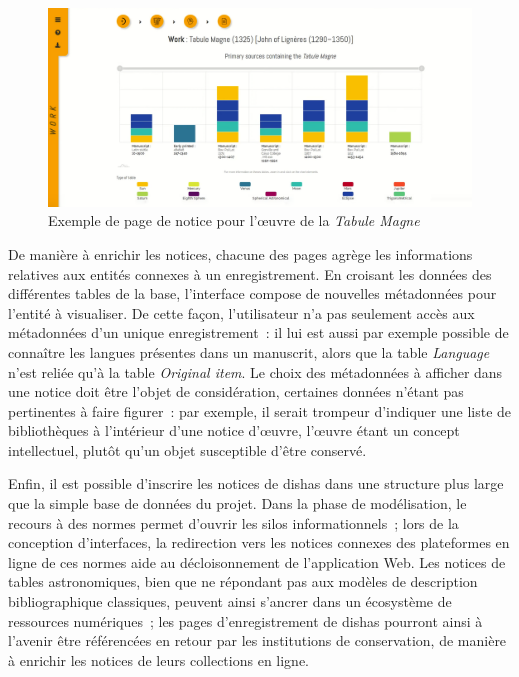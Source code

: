 \documentclass[a4paper,12pt,twoside]{book}
\newcommand{\eng}{\emph}
\newcommand{\Oi}{\eng{Original item}\xspace}
\newcommand{\bdd}{base de données\xspace}
\newcommand{\dishas}{\gls{dishas}\xspace}
\begin{document}
\begin{figure}[h!]
	\centering
	\includegraphics[width=15cm]{Images/Template-record-page.png}
	\caption{Exemple de page de notice pour l'œuvre de la \emph{Tabule Magne}}
\end{figure}

De manière à enrichir les notices, chacune des pages agrège les informations relatives aux entités connexes à un enregistrement. En croisant les données des différentes tables de la base, l'interface compose de nouvelles métadonnées pour l'entité à visualiser. De cette façon, l'utilisateur n'a pas seulement accès aux métadonnées d'un unique enregistrement~: il lui est aussi par exemple possible de connaître les langues présentes dans un manuscrit, alors que la table \eng{Language} n'est reliée qu'à la table \Oi. Le choix des métadonnées à afficher dans une notice doit être l'objet de considération, certaines données n'étant pas pertinentes à faire figurer~: par exemple, il serait trompeur d'indiquer une liste de bibliothèques à l'intérieur d'une notice d'œuvre, l'œuvre étant un concept intellectuel, plutôt qu'un objet susceptible d'être conservé.

Enfin, il est possible d'inscrire les notices de \dishas dans une structure plus large que la simple \bdd du projet. Dans la phase de modélisation, le recours à des normes permet d'ouvrir les silos informationnels~; lors de la conception d'interfaces, la redirection vers les notices connexes des plateformes en ligne de ces normes aide au décloisonnement de l'application Web. Les notices de tables astronomiques, bien que ne répondant pas aux modèles de description bibliographique classiques, peuvent ainsi s'ancrer dans un écosystème de ressources numériques~; les pages d'enregistrement de \dishas pourront ainsi à l'avenir être référencées en retour par les institutions de conservation, de manière à enrichir les notices de leurs collections en ligne.
\end{document}
